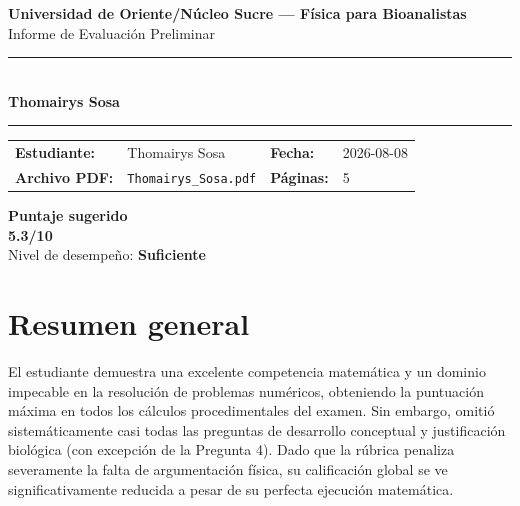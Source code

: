 \documentclass[11pt,a4paper]{article}
\begin{document}
\begin{center}
  {\Large\bfseries\color{azulTitulo} Universidad de Oriente/Núcleo Sucre --- Física para Bioanalistas}\\[4pt]
  {\large Informe de Evaluación Preliminar}\\[12pt]
  \rule{\linewidth}{1.2pt}\\[6pt]
  {\LARGE\bfseries Thomairys Sosa}\\[4pt]
  \rule{\linewidth}{0.6pt}
\end{center}

\vspace{4pt}
\begin{tcolorbox}[cajaTitulo, title=Datos del informe]
\begin{tabular}{@{}llll@{}}
  \textbf{Estudiante:}  & Thomairys Sosa  &
  \textbf{Fecha:}       & 2026-08-08 \\[4pt]
  \textbf{Archivo PDF:} & \texttt{Thomairys\_Sosa.pdf}  &
  \textbf{Páginas:}     & 5 \\
\end{tabular}
\end{tcolorbox}

\vspace{6pt}
\begin{center}
  \begin{tcolorbox}[
    enhanced,
    colback=white, colframe=desempeno_suficiente,
    width=0.62\linewidth,
    boxrule=2pt,
    halign=center, valign=center,
    top=8pt, bottom=8pt,
  ]
    \centering
    {\large\bfseries Puntaje sugerido}\\[6pt]
    {\Huge\bfseries\color{desempeno_suficiente} 5.3/10}\\[6pt]
    {\large Nivel de desempeño: \textbf{\color{desempeno_suficiente} Suficiente}}
  \end{tcolorbox}
\end{center}

\section*{Resumen general}
El estudiante demuestra una excelente competencia matemática y un dominio impecable en la resolución de problemas numéricos, obteniendo la puntuación máxima en todos los cálculos procedimentales del examen. Sin embargo, omitió sistemáticamente casi todas las preguntas de desarrollo conceptual y justificación biológica (con excepción de la Pregunta 4). Dado que la rúbrica penaliza severamente la falta de argumentación física, su calificación global se ve significativamente reducida a pesar de su perfecta ejecución matemática.
\end{document}
